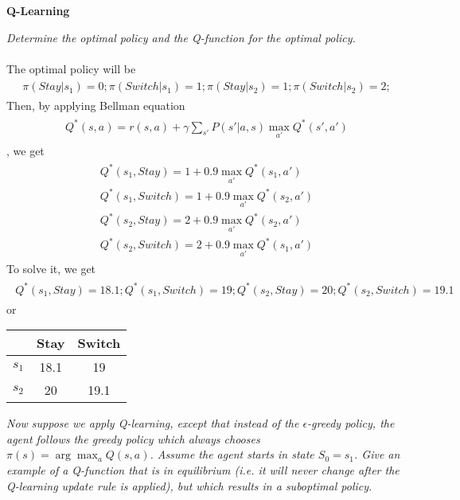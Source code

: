 \documentclass{myhw}
\begin{document}
\begin{homeworkProblem}
\textbf{Q-Learning}
\begin{homeworkSection}	
\emph{Determine the optimal policy and the Q-function for the optimal policy.} \\
\\
The optimal policy will be 
\begin{gather*}
\begin{aligned}
\pi(Stay|s_1) = 0; 
\pi(Switch|s_1) = 1; 
\pi(Stay|s_2) = 1; 
\pi(Switch|s_2) = 2; 
\end{aligned}
\end{gather*}
Then, by applying Bellman equation
\begin{gather*}
\begin{aligned}
Q^*(s,a) = r(s,a) + \gamma \sum_{s'} P(s'|a,s) \max_{a'} Q^*(s',a')
\end{aligned}
\end{gather*}
, we get
\begin{gather*}
\begin{aligned}
Q^*(s_1,Stay) = 1 + 0.9 \max_{a'} Q^*(s_1,a') \\
Q^*(s_1,Switch) = 1 + 0.9 \max_{a'} Q^*(s_2,a') \\
Q^*(s_2,Stay) = 2 + 0.9 \max_{a'} Q^*(s_2,a') \\
Q^*(s_2,Switch) = 2 + 0.9 \max_{a'} Q^*(s_1,a') 
\end{aligned}
\end{gather*}
To solve it, we get
\begin{gather*}
\begin{aligned}
Q^*(s_1,Stay) = 18.1;
Q^*(s_1,Switch) = 19;
Q^*(s_2,Stay) = 20; 
Q^*(s_2,Switch) = 19.1 
\end{aligned}
\end{gather*}
or
\begin{center}
\begin{tabular}{c|c|c}
  & Stay & Switch \\ 
 \hline
 $s_1$ & 18.1 & 19 \\  
 \hline
 $s_2$ & 20 & 19.1    
\end{tabular}
\end{center}
\end{homeworkSection}
\begin{homeworkSection}	
\emph{Now suppose we apply Q-learning, except that instead of the $\epsilon$-greedy policy, the agent follows the greedy policy which always chooses $\pi(s) = \arg \max_a Q(s,a)$. Assume the agent starts in state $S_0 = s_1$. Give an example of a Q-function that is in equilibrium (i.e. it will never change after the Q-learning update rule is applied), but which results in a suboptimal policy.} \\

\end{homeworkSection}
\end{homeworkProblem}
\end{document}
